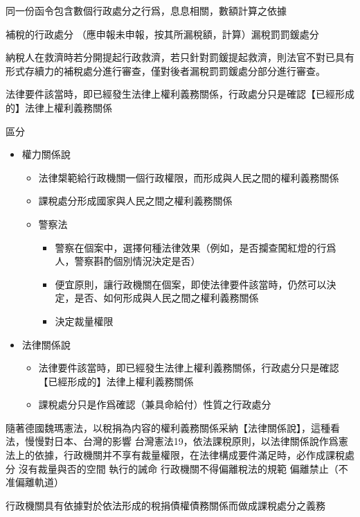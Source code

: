 \documentclass[]{ctexbook}
\providecommand{\tightlist}{%
  \setlength{\itemsep}{0pt}\setlength{\parskip}{0pt}}
\begin{document}
同一份函令包含數個行政處分之行爲，息息相關，數額計算之依據

補稅的行政處分
（應申報未申報，按其所漏稅額，計算）漏稅罰罰鍰處分

納稅人在救濟時若分開提起行政救濟，若只針對罰鍰提起救濟，則法官不對已具有形式存續力的補稅處分進行審查，僅對後者漏稅罰罰鍰處分部分進行審查。

法律要件該當時，即已經發生法律上權利義務關係，行政處分只是確認【已經形成的】法律上權利義務關係

區分

\begin{itemize}
\tightlist
\item
  權力關係說

  \begin{itemize}
  \tightlist
  \item
    法律槼範給行政機關一個行政權限，而形成與人民之間的權利義務關係
  \item
    課稅處分形成國家與人民之間之權利義務關係
  \item
    警察法

    \begin{itemize}
    \tightlist
    \item
      警察在個案中，選擇何種法律效果（例如，是否攔查闖紅燈的行爲人，警察斟酌個別情況決定是否）
    \item
      便宜原則，讓行政機關在個案，即使法律要件該當時，仍然可以決定，是否、如何形成與人民之間之權利義務關係
    \item
      決定裁量權限
    \end{itemize}
  \end{itemize}
\item
  法律關係說

  \begin{itemize}
  \tightlist
  \item
    法律要件該當時，即已經發生法律上權利義務關係，行政處分只是確認【已經形成的】法律上權利義務關係
  \item
    課稅處分只是作爲確認（兼具命給付）性質之行政處分
  \end{itemize}
\end{itemize}

隨著德國魏瑪憲法，以稅捐為内容的權利義務關係采納【法律關係說】，這種看法，慢慢對日本、台灣的影響
台灣憲法19，依法課稅原則，以法律關係說作爲憲法上的依據，行政機關并不享有裁量權限，在法律構成要件滿足時，必作成課稅處分
沒有裁量與否的空間
執行的誡命
行政機關不得偏離稅法的規範
偏離禁止（不准偏離軌道）

行政機關具有依據對於依法形成的稅捐債權債務關係而做成課稅處分之義務
\end{document}

